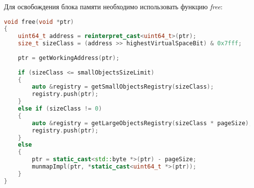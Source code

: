Для освобождения блока памяти необходимо использовать функцию \textit{free}:
\begin{lstlisting}[language=c++,numbers=none]
void free(void *ptr)
{
	uint64_t address = reinterpret_cast<uint64_t>(ptr);
	size_t sizeClass = (address >> highestVirtualSpaceBit) & 0x7fff;
	
	ptr = getWorkingAddress(ptr);
	
	if (sizeClass <= smallObjectsSizeLimit)
	{
		auto &registry = getSmallObjectsRegistry(sizeClass);
		registry.push(ptr);
	}
	else if (sizeClass != 0)
	{
		auto &registry = getLargeObjectsRegistry(sizeClass * pageSize);
		registry.push(ptr);
	}
	else
	{
		ptr = static_cast<std::byte *>(ptr) - pageSize;
		munmapImpl(ptr, *static_cast<uint64_t *>(ptr));
	}
}
\end{lstlisting}